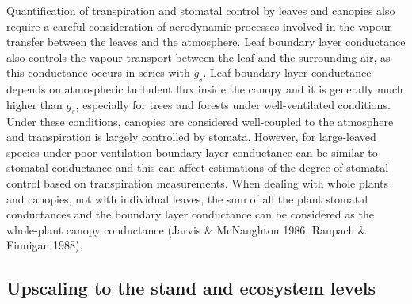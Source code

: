 \documentclass[11pt,twoside]{reedthesis}
\begin{document}
Quantification of transpiration and stomatal control by leaves and
canopies also require a careful consideration of aerodynamic processes
involved in the vapour transfer between the leaves and the atmosphere.
Leaf boundary layer conductance also controls the vapour transport
between the leaf and the surrounding air, as this conductance occurs in
series with \(g_s\). Leaf boundary layer conductance depends on
atmospheric turbulent flux inside the canopy and it is generally much
higher than \(g_s\), especially for trees and forests under
well-ventilated conditions. Under these conditions, canopies are
considered well-coupled to the atmosphere and transpiration is largely
controlled by stomata. However, for large-leaved species under poor
ventilation boundary layer conductance can be similar to stomatal
conductance and this can affect estimations of the degree of stomatal
control based on transpiration measurements. When dealing with whole
plants and canopies, not with individual leaves, the sum of all the
plant stomatal conductances and the boundary layer conductance can be
considered as the whole-plant canopy conductance (Jarvis \& McNaughton
1986, Raupach \& Finnigan 1988).\par

\subsection{Upscaling to the stand and ecosystem
levels}\label{upscaling-to-the-stand-and-ecosystem-levels}
\end{document}
